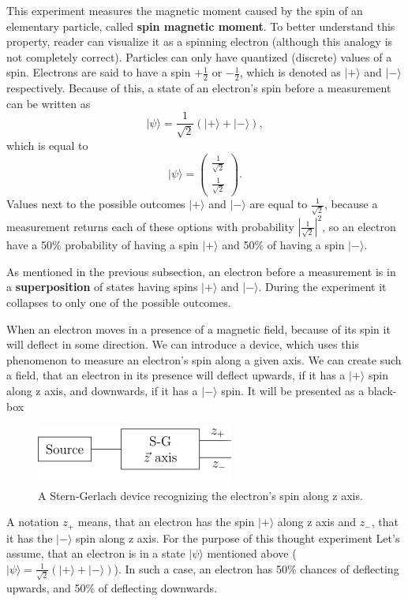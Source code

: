 This experiment measures the magnetic moment caused by the spin of an elementary particle, called \textbf{spin magnetic moment}. To better understand this property, reader can visualize it as a spinning electron (although this analogy is not completely correct). Particles can only have quantized (discrete) values of a spin. Electrons are said to have a spin $+\frac{1}{2}$ or $-\frac{1}{2}$, which is denoted as $| + \rangle$ and $|-\rangle$ respectively. Because of this, a state of an electron's spin before a measurement can be written as
\[ | \psi \rangle = \frac{1}{\sqrt{2}}(|+\rangle + |-\rangle ), \]
which is equal to
\[ |\psi \rangle = \begin{pmatrix} \frac{1}{\sqrt{2}} \\  \frac{1}{\sqrt{2}} \end{pmatrix}. \]
Values next to the possible outcomes $|+\rangle$ and $|-\rangle$ are equal to $\frac{1}{\sqrt{2}}$, because a measurement returns each of these options with probability $|\frac{1}{\sqrt{2}}|^2$, so an electron have a 50\% probability of having a spin $|+\rangle$ and 50\% of having a spin $|-\rangle$.
\begin{remark}
As mentioned in the previous subsection, an electron before a measurement is in a \textbf{superposition} of states having spins $|+\rangle$ and $|-\rangle$. During the experiment it collapses to only one of the possible outcomes.
\end{remark}

When an electron moves in a presence of a magnetic field, because of its spin it will deflect in some direction. We can introduce a device, which uses this phenomenon to measure an electron's spin along a given axis. We can create such a field, that an electron in its presence will deflect upwards, if it has a $|+\rangle$ spin along z axis, and downwards, if it has a $|-\rangle$ spin. It will be presented as a black-box

\begin{figure}[ht]
\centering
\includegraphics{stern_gerlach_device}
\caption{A Stern-Gerlach device recognizing the electron's spin along z axis.}
\end{figure}

A notation $z_+$ means, that an electron has the spin $|+\rangle$ along z axis and $z_-$, that it has the $|-\rangle$ spin along z axis. For the purpose of this thought experiment Let's assume, that an electron is in a state $|\psi \rangle$ mentioned above ($| \psi \rangle = \frac{1}{\sqrt{2}}(|+\rangle + |-\rangle )$). In such a case, an electron has 50\% chances of deflecting upwards, and 50\% of deflecting downwards. \newline

